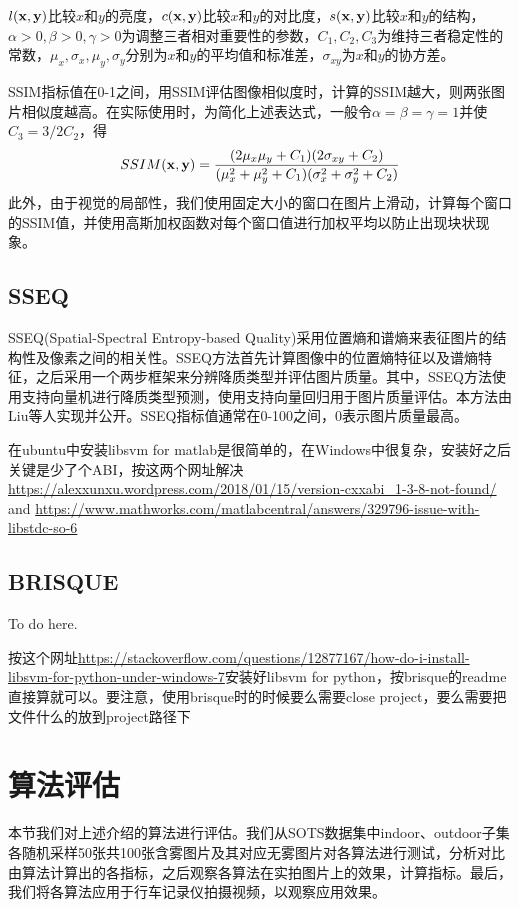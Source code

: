\documentclass[a4paper, 12pt, oneside]{report}
\begin{document}
{$l{\bf (x, y)}$比较$x$和$y$的亮度，$c{\bf (x, y)}$比较$x$和$y$的对比度，$s{\bf (x, y)}$比较$x$和$y$的结构，$\alpha > 0, \beta > 0, \gamma > 0$为调整三者相对重要性的参数，$C_1, C_2, C_3$为维持三者稳定性的常数，$\mu_x, \sigma_x, \mu_y, \sigma_y$分别为$x$和$y$的平均值和标准差，$\sigma_{xy}$为$x$和$y$的协方差。

SSIM指标值在0-1之间，用SSIM评估图像相似度时，计算的SSIM越大，则两张图片相似度越高。在实际使用时，为简化上述表达式，一般令$\alpha = \beta = \gamma = 1$并使$C_3 = 3/2 C_2$，得
\begin{equation}
SSIM({\bf x, y}) = \frac{(2\mu_x\mu_y + C_1)(2\sigma_{xy}+ C_2)}{(\mu_x^2 + \mu_y^2 + C_1)(\sigma_x^2 + \sigma_y^2 + C_2)}
\end{equation}
此外，由于视觉的局部性，我们使用固定大小的窗口在图片上滑动，计算每个窗口的SSIM值，并使用高斯加权函数对每个窗口值进行加权平均以防止出现块状现象。

\subsection{SSEQ\quad}
SSEQ\cite{ref25}(Spatial-Spectral Entropy-based Quality)采用位置熵和谱熵来表征图片的结构性及像素之间的相关性。SSEQ方法首先计算图像中的位置熵特征以及谱熵特征，之后采用一个两步框架来分辨降质类型并评估图片质量。其中，SSEQ方法使用支持向量机进行降质类型预测，使用支持向量回归用于图片质量评估。本方法由Liu等人实现并公开。SSEQ指标值通常在0-100之间，0表示图片质量最高。

在ubuntu中安装libsvm for matlab是很简单的，在Windows中很复杂，安装好之后关键是少了个ABI，按这两个网址解决\url{https://alexxunxu.wordpress.com/2018/01/15/version-cxxabi_1-3-8-not-found/} and \url{https://www.mathworks.com/matlabcentral/answers/329796-issue-with-libstdc-so-6}

\subsection{BRISQUE\quad}
To do here\cite{ref26}.

按这个网址\url{https://stackoverflow.com/questions/12877167/how-do-i-install-libsvm-for-python-under-windows-7}安装好libsvm for python，按brisque的readme直接算就可以。要注意，使用brisque时的时候要么需要close project，要么需要把文件什么的放到project路径下

\section{算法评估\quad}
本节我们对上述介绍的算法进行评估。我们从SOTS数据集中indoor、outdoor子集各随机采样50张共100张含雾图片及其对应无雾图片对各算法进行测试，分析对比由算法计算出的各指标，之后观察各算法在实拍图片上的效果，计算指标。最后，我们将各算法应用于行车记录仪拍摄视频，以观察应用效果。

}
\end{document}
